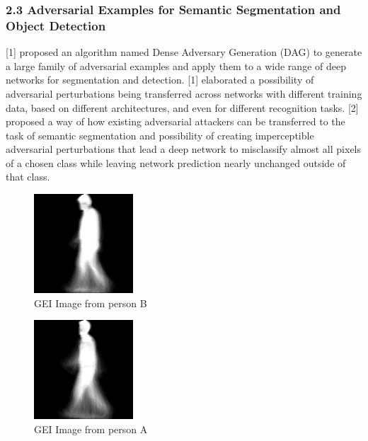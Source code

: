 \documentclass[letterpaper]{article} %
\begin{document}
\subsubsection{2.3 Adversarial Examples for Semantic Segmentation and Object Detection}
[1] proposed an algorithm named Dense Adversary Generation (DAG) to generate a large family of adversarial examples and apply them to a wide range of deep networks for segmentation and detection. [1] elaborated a possibility of adversarial perturbations being transferred across networks with different training data, based on different architectures, and even for different recognition tasks. [2] proposed a way of how existing adversarial attackers can be transferred to the task of semantic segmentation and possibility of creating imperceptible adversarial perturbations that lead a deep network to misclassify almost all pixels of a chosen class while leaving network prediction nearly unchanged outside of that class.

 \begin{figure}
\centering
\includegraphics[width=0.6\columnwidth]{dl1.png} 
\caption{GEI Image from person B}
\label{fig2}
\end{figure}

 \begin{figure}
\centering
\includegraphics[width=0.6\columnwidth]{dl2.png} 
\caption{GEI Image from person A}
\label{fig3}
\end{figure}
\end{document}

